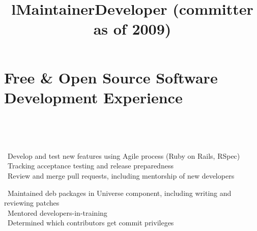     \section{Free \& Open Source Software Development Experience}
        \begin{format}
            \\
            \title{l}\\
            \body
        \end{format}

        \location{}
        \title{Maintainer}
        \begin{position}
            \textbullet \ Develop and test new features using Agile process (Ruby on Rails, RSpec)\\
            \textbullet \ Tracking acceptance testing and release preparedness\\
            \textbullet \ Review and merge pull requests, including mentorship of new developers
        \end{position}


        \location{}
        \title{Developer (committer as of 2009)}
        \begin{position}
            \textbullet \ Maintained deb packages in Universe component, including writing and reviewing patches\\
            \textbullet \ Mentored developers-in-training\\
            \textbullet \ Determined which contributors get commit privileges
        \end{position}

